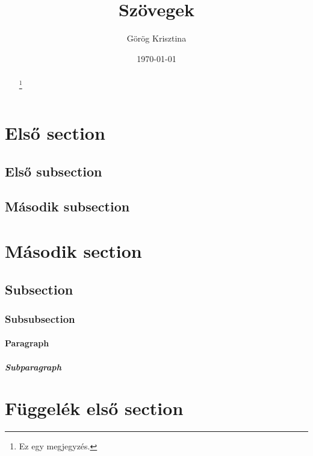 \documentclass[twoside]{article}
\title{Szövegek}
\author{Görög Krisztina}
\date{\today}
\begin{document}
\pagestyle{fancy}

\renewcommand{\footrulewidth}{0.4pt}
\fancyhead[LE,RO]{\thepage}
\fancyhead[LO]{\leftmark}
\fancyhead[RE]{\rightmark}

\renewcommand{\thefootnote}{\fnsymbol{footnote}}
\maketitle

\begin{abstract}
\hulipsum[1]\footnote{Ez egy megjegyzés.}
\end{abstract}

\setcounter{tocdepth}{5}
\tableofcontents
\clearpage

\setcounter{secnumdepth}{5}

\section{Első section}
\subsection{Első subsection}
\hulipsum

\subsection{Második subsection}
\hulipsum

\section[Második]{Második section}
\subsection{Subsection}
\subsubsection{Subsubsection}
\paragraph{Paragraph}
\subparagraph{Subparagraph}

\appendix
\section{Függelék első section}
\end{document}
